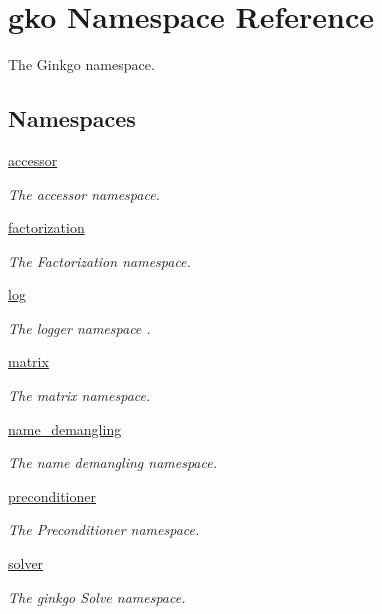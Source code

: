 \hypertarget{namespacegko}{}\section{gko Namespace Reference}
\label{namespacegko}


The Ginkgo namespace.  


\subsection*{Namespaces}
\begin{DoxyCompactItemize}
\item 
 \hyperlink{namespacegko_1_1accessor}{accessor}
\begin{DoxyCompactList}\small\item\em The accessor namespace. \end{DoxyCompactList}\item 
 \hyperlink{namespacegko_1_1factorization}{factorization}
\begin{DoxyCompactList}\small\item\em The Factorization namespace. \end{DoxyCompactList}\item 
 \hyperlink{namespacegko_1_1log}{log}
\begin{DoxyCompactList}\small\item\em The logger namespace . \end{DoxyCompactList}\item 
 \hyperlink{namespacegko_1_1matrix}{matrix}
\begin{DoxyCompactList}\small\item\em The matrix namespace. \end{DoxyCompactList}\item 
 \hyperlink{namespacegko_1_1name__demangling}{name\+\_\+demangling}
\begin{DoxyCompactList}\small\item\em The name demangling namespace. \end{DoxyCompactList}\item 
 \hyperlink{namespacegko_1_1preconditioner}{preconditioner}
\begin{DoxyCompactList}\small\item\em The Preconditioner namespace. \end{DoxyCompactList}\item 
 \hyperlink{namespacegko_1_1solver}{solver}
\begin{DoxyCompactList}\small\item\em The ginkgo Solve namespace. \end{DoxyCompactList}\item 

\end{DoxyCompactItemize}
